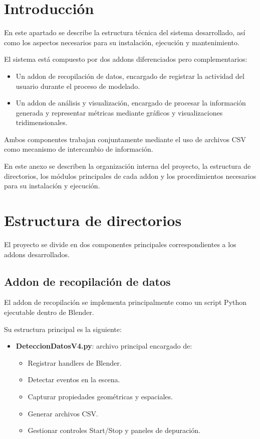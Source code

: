
\section{Introducción}

En este apartado se describe la estructura técnica del sistema desarrollado, así como los aspectos necesarios para su instalación, ejecución y mantenimiento.

El sistema está compuesto por dos addons diferenciados pero complementarios:

\begin{itemize}
    \item Un addon de recopilación de datos, encargado de registrar la actividad del usuario durante el proceso de modelado.
    \item Un addon de análisis y visualización, encargado de procesar la información generada y representar métricas mediante gráficos y visualizaciones tridimensionales.
\end{itemize}

Ambos componentes trabajan conjuntamente mediante el uso de archivos CSV como mecanismo de intercambio de información.

En este anexo se describen la organización interna del proyecto, la estructura de directorios, los módulos principales de cada addon y los procedimientos necesarios para su instalación y ejecución.

\section{Estructura de directorios}

El proyecto se divide en dos componentes principales correspondientes a los addons desarrollados.

\subsection{Addon de recopilación de datos}

El addon de recopilación se implementa principalmente como un script Python ejecutable dentro de Blender.

Su estructura principal es la siguiente:

\begin{itemize}
    \item \textbf{DeteccionDatosV4.py}: archivo principal encargado de:
    \begin{itemize}
        \item Registrar handlers de Blender.
        \item Detectar eventos en la escena.
        \item Capturar propiedades geométricas y espaciales.
        \item Generar archivos CSV.
        \item Gestionar controles Start/Stop y paneles de depuración.
    \end{itemize}
\end{itemize}

